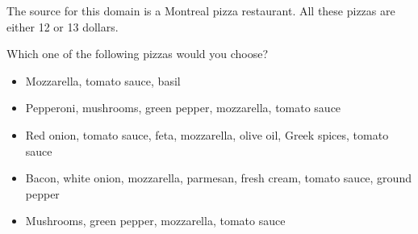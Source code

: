 The source for this domain is a Montreal pizza restaurant.
All these pizzas are either 12 or 13 dollars.

\begin{tcolorbox}
Which one of the following pizzas would you choose?

\begin{itemize}
	\setlength\itemsep{-5pt}
	\item Mozzarella, tomato sauce, basil
	\item Pepperoni, mushrooms, green pepper, mozzarella, tomato sauce
	\item Red onion, tomato sauce, feta, mozzarella, olive oil, Greek spices,
tomato sauce
	\item Bacon, white onion, mozzarella, parmesan, fresh cream, tomato sauce,
ground pepper
	\item Mushrooms, green pepper, mozzarella, tomato sauce
\end{itemize}
\end{tcolorbox}
